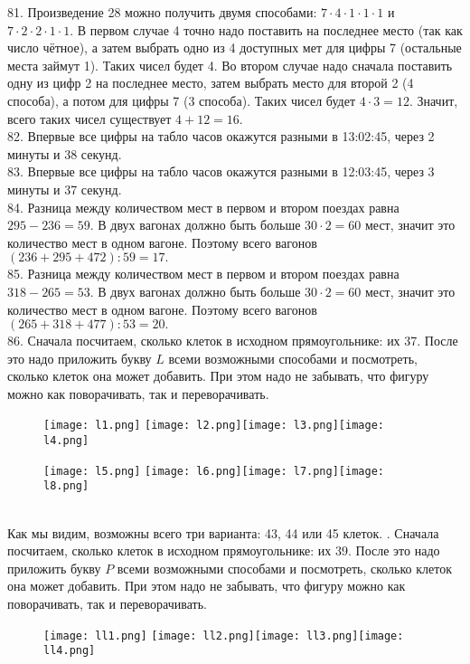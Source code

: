 81. Произведение 28 можно получить двумя способами: $7\cdot4\cdot1\cdot1\cdot1$ и $7\cdot2\cdot2\cdot1\cdot1.$ В первом случае 4 точно надо поставить на последнее место (так как число чётное), а затем выбрать одно из 4 доступных мет для цифры 7 (остальные места займут 1). Таких чисел будет 4. Во втором случае надо сначала поставить одну из цифр 2 на последнее место, затем выбрать место для второй 2 (4 способа), а потом для цифры 7 (3 способа). Таких чисел будет $4\cdot3=12.$ Значит, всего таких чисел существует $4+12=16.$\\
82. Впервые все цифры на табло часов окажутся разными в 13:02:45, через 2 минуты и 38 секунд.\\
83. Впервые все цифры на табло часов окажутся разными в 12:03:45, через 3 минуты и 37 секунд.\\
84. Разница между количеством мест в первом и втором поездах равна $295-236=59.$ В двух вагонах должно быть больше $30\cdot2=60$ мест, значит это количество мест в одном вагоне. Поэтому всего вагонов $(236+295+472):59=17.$\\
85. Разница между количеством мест в первом и втором поездах равна $318-265=53.$ В двух вагонах должно быть больше $30\cdot2=60$ мест, значит это количество мест в одном вагоне. Поэтому всего вагонов $(265+318+477):53=20.$\\
86. Сначала посчитаем, сколько клеток в исходном прямоугольнике: их 37. После это надо приложить букву $L$ всеми возможными способами и посмотреть, сколько клеток она может добавить. При этом надо не забывать, что фигуру можно как поворачивать, так и переворачивать.
\begin{figure}[ht!]
\texttt{[image: l1.png]} \texttt{[image: l2.png]}\texttt{[image: l3.png]}\texttt{[image: l4.png]}\end{figure}
\begin{figure}[ht!]\texttt{[image: l5.png]} \texttt{[image: l6.png]}\texttt{[image: l7.png]}\texttt{[image: l8.png]}
\end{figure}\\
Как мы видим, возможны всего три варианта: 43, 44 или 45 клеток.
\newpage{}. Сначала посчитаем, сколько клеток в исходном прямоугольнике: их 39. После это надо приложить букву $P$ всеми возможными способами и посмотреть, сколько клеток она может добавить. При этом надо не забывать, что фигуру можно как поворачивать, так и переворачивать.
\begin{figure}[ht!]
\texttt{[image: ll1.png]} \texttt{[image: ll2.png]}\texttt{[image: ll3.png]}\texttt{[image: ll4.png]}\end{figure}
